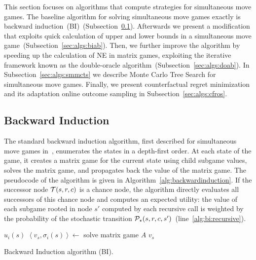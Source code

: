 
This section focuses on algorithms that compute strategies for simultaneous move games.
The baseline algorithm for solving simultaneous move games exactly is backward induction~(BI)~(Subsection~\ref{sec:algs:bi}).
Afterwards we present a modification that exploits quick calculation of upper and lower bounds in a simultaneous move game~(Subsection~\ref{sec:algs:biab}).
Then, we further improve the algorithm by speeding up the calculation of NE in matrix games, exploiting the iterative framework known as the double-oracle algorithm~(Subsection~\ref{sec:algs:doab}).
In Subsection~\ref{sec:algs:smmcts} we describe Monte Carlo Tree Search for simultaneous move games.
Finally, we present counterfactual regret minimization and its adaptation online outcome sampling in Subsection~\ref{sec:algs:cfros}.


\subsection{Backward Induction}\label{sec:algs:bi}

The standard backward induction algorithm, first described for simultaneous move games in~\cite{Ross71Goofspiel}, enumerates the states in a depth-first order. At each state of the game, it creates a matrix game for the current state using child subgame values, solves the matrix game, and propagates back the value of the matrix game. The pseudocode of the algorithm is given in Algorithm~\ref{alg:backwardinduction}. If the successor node $\mathcal{T}(s,r,c)$ is a chance node, the algorithm directly evaluates all successors of this chance node and computes an expected utility: the value of each subgame rooted in node $s'$ computed by each recursive call is weighted by the probability of the stochastic transition $\mathcal{P}_\star(s,r,c,s')$~(line~\ref{alg:bi:recursive}).

\begin{algorithm2e}[t]
\small
{}
 {\Return $u_i(s)$} \label{alg:bi:stop1}
$\left\langle v_s, \sigma_i(s) \right\rangle \leftarrow$ solve matrix game $A$\;  \label{alg:bi:solve}
\Return $v_s$ \label{alg:bi:stop2}
\caption{Backward Induction algorithm (BI).}\label{alg:backwardinduction}
\end{algorithm2e}

